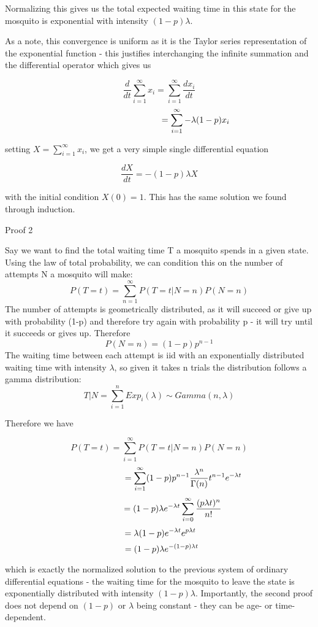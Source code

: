 \documentclass{article}
\begin{document}
Normalizing this gives us the total expected waiting time in this state for the
mosquito is exponential with intensity $(1-p) \lambda$.

As a note, this convergence is uniform as it is the Taylor series representation
of the exponential function - this justifies interchanging the infinite summation and
the differential operator which gives us

$$\frac{d}{dt} \sum_{i=1}^{\infty} x_i = \sum_{i=1}^{\infty}\frac{d x_i}{dt}$$
$$\hspace*{3cm} = \sum_{i=1}^{\infty}-\lambda (1-p) x_i$$

setting $X = \sum_{i=1}^{\infty}x_i$, we get a very simple single differential equation

$$\frac{dX}{dt} = - (1-p) \lambda X$$

with the initial condition $X(0) = 1$. This has the same solution we found through induction.

\begin{bf}
Proof 2
\end{bf}

Say we want to find the total waiting time T a mosquito spends in a given state.
Using the law of total probability, we can condition this on the number of attempts N
a mosquito will make:
$$P(T=t) = \sum_{n=1}^{\infty} P(T=t| N=n) P(N=n)$$
The number of attempts is geometrically distributed, as it will succeed or give up
with probability (1-p) and therefore try again with probability p - it will try until
it succeeds or gives up. Therefore
$$P(N=n) = (1-p)p^{n-1}$$
The waiting time between each attempt is iid with an exponentially distributed waiting
time with intensity $\lambda$, so given it takes n trials the distribution follows
a gamma distribution:
$$T|N = \sum_{i=1}^{n}Exp_i(\lambda) \sim Gamma (n,\lambda)$$

Therefore we have

$$P(T=t) = \sum_{i=1}^{\infty}P(T=t|N=n)P(N=n)$$
$$ \hspace*{2cm} = \sum_{i=1}^{\infty}(1-p)p^{n-1}\frac{\lambda^n}{\Gamma (n)}t^{n-1} e^{-\lambda t}$$
$$ \indent \hspace*{.5cm} = (1-p) \lambda e^{-\lambda t} \sum_{i=0}^{\infty} \frac{(p\lambda t)^n}{n!}$$
$$ \hspace*{.1cm} = \lambda (1-p) e^{-\lambda t} e^{p\lambda t}$$
$$\hspace*{.2cm} = (1-p) \lambda e^{-(1-p) \lambda t} $$

which is exactly the normalized solution to the previous system of ordinary differential
equations - the waiting time for the mosquito to leave the state is exponentially 
distributed with intensity $(1-p) \lambda$. Importantly, the second proof does not depend on $(1-p)$ or $\lambda$ being constant - they can be age- or time-dependent.
\end{document}
